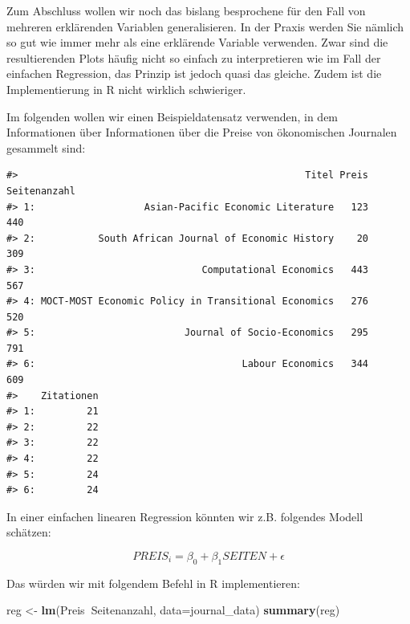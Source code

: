 \documentclass[]{book}
\newenvironment{Shaded}{\begin{snugshade}}{\end{snugshade}}
\newcommand{\KeywordTok}[1]{\textcolor[rgb]{0.13,0.29,0.53}{\textbf{#1}}}
\newcommand{\DataTypeTok}[1]{\textcolor[rgb]{0.13,0.29,0.53}{#1}}
\newcommand{\StringTok}[1]{\textcolor[rgb]{0.31,0.60,0.02}{#1}}
\newcommand{\OperatorTok}[1]{\textcolor[rgb]{0.81,0.36,0.00}{\textbf{#1}}}
\newcommand{\NormalTok}[1]{#1}
\begin{document}
Zum Abschluss wollen wir noch das bislang besprochene für den Fall von
mehreren erklärenden Variablen generalisieren. In der Praxis werden Sie
nämlich so gut wie immer mehr als eine erklärende Variable verwenden.
Zwar sind die resultierenden Plots häufig nicht so einfach zu
interpretieren wie im Fall der einfachen Regression, das Prinzip ist
jedoch quasi das gleiche. Zudem ist die Implementierung in R nicht
wirklich schwieriger.

Im folgenden wollen wir einen Beispieldatensatz verwenden, in dem
Informationen über Informationen über die Preise von ökonomischen
Journalen gesammelt sind:

\begin{Shaded}
\end{Shaded}

\begin{verbatim}
#>                                                  Titel Preis Seitenanzahl
#> 1:                   Asian-Pacific Economic Literature   123          440
#> 2:           South African Journal of Economic History    20          309
#> 3:                             Computational Economics   443          567
#> 4: MOCT-MOST Economic Policy in Transitional Economics   276          520
#> 5:                          Journal of Socio-Economics   295          791
#> 6:                                    Labour Economics   344          609
#>    Zitationen
#> 1:         21
#> 2:         22
#> 3:         22
#> 4:         22
#> 5:         24
#> 6:         24
\end{verbatim}

In einer einfachen linearen Regression könnten wir z.B. folgendes Modell
schätzen:

\[PREIS_i = \beta_0 + \beta_1 SEITEN + \epsilon\]

Das würden wir mit folgendem Befehl in R implementieren:

\begin{Shaded}
\begin{Highlighting}[]
\NormalTok{reg <-}\StringTok{ }\KeywordTok{lm}\NormalTok{(Preis}\OperatorTok{~}\NormalTok{Seitenanzahl, }\DataTypeTok{data=}\NormalTok{journal_data)}
\KeywordTok{summary}\NormalTok{(reg)}
\end{Highlighting}
\end{Shaded}
\end{document}

